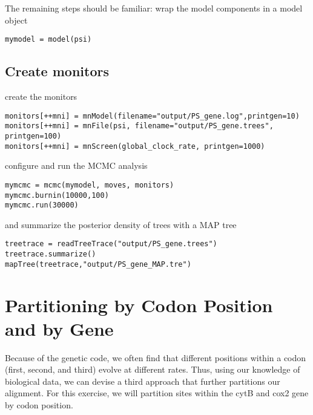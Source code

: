 The remaining steps should be familiar:
wrap the model components in a model object

{\tt \begin{snugshade*}
\begin{lstlisting}
mymodel = model(psi)
\end{lstlisting}
\end{snugshade*}}

\subsection{Create monitors}

create the monitors

{\tt \begin{snugshade*}
\begin{lstlisting}
monitors[++mni] = mnModel(filename="output/PS_gene.log",printgen=10)
monitors[++mni] = mnFile(psi, filename="output/PS_gene.trees", printgen=100)
monitors[++mni] = mnScreen(global_clock_rate, printgen=1000)
\end{lstlisting}
\end{snugshade*}}

configure and run the MCMC analysis

{\tt \begin{snugshade*}
\begin{lstlisting}
mymcmc = mcmc(mymodel, moves, monitors)
mymcmc.burnin(10000,100)
mymcmc.run(30000)
\end{lstlisting}
\end{snugshade*}}

and summarize the posterior density of trees with a MAP tree

{\tt \begin{snugshade*}
\begin{lstlisting}
treetrace = readTreeTrace("output/PS_gene.trees")
treetrace.summarize()
mapTree(treetrace,"output/PS_gene_MAP.tre")
\end{lstlisting}
\end{snugshade*}}



\section{Partitioning by Codon Position and by Gene}\label{secExtremeP}

Because of the genetic code, we often find that different positions within a codon (first, second, and third) evolve at different rates.
Thus, using our knowledge of biological data, we can devise a third approach that further partitions our alignment. 
For this exercise, we will partition sites within the cytB and cox2 gene by codon position.

